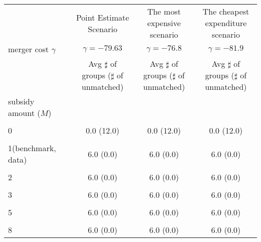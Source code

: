 \begin{tabular}{@{\extracolsep{5pt}}lcccc}
\toprule 
 &  & Point Estimate Scenario & The most expensive scenario & The cheapest expenditure scenario \\
merger cost $\gamma$ &  & $\gamma=-79.63$ & $\gamma=-76.8$ & $\gamma=-81.9$ \\
 &  & Avg $\sharp$ of groups ($\sharp$ of unmatched) & Avg $\sharp$ of groups ($\sharp$ of unmatched) & Avg $\sharp$ of groups ($\sharp$ of unmatched) \\
\midrule 
subsidy amount ($M$) &  &  &  &  \\
 &  &  &  &  \\
0 &  & 0.0 (12.0) & 0.0 (12.0) & 0.0 (12.0) \\
 &  &  &  &  \\
1(benchmark, data) &  & 6.0 (0.0) & 6.0 (0.0) & 6.0 (0.0) \\
 &  &  &  &  \\
2 &  & 6.0 (0.0) & 6.0 (0.0) & 6.0 (0.0) \\
 &  &  &  &  \\
3 &  & 6.0 (0.0) & 6.0 (0.0) & 6.0 (0.0) \\
 &  &  &  &  \\
5 &  & 6.0 (0.0) & 6.0 (0.0) & 6.0 (0.0) \\
 &  &  &  &  \\
8 &  & 6.0 (0.0) & 6.0 (0.0) & 6.0 (0.0) \\
\hline 
\bottomrule 
\end{tabular}
